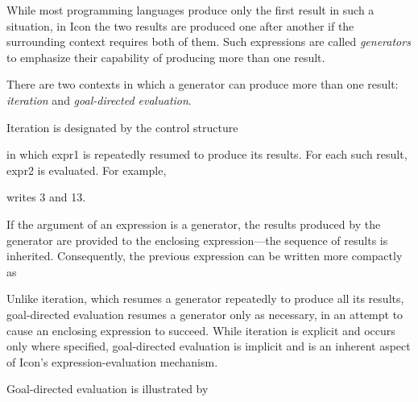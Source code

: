 While most programming languages produce only the first result in such
a situation, in Icon the two results are produced one after another if
the surrounding context requires both of them. Such expressions are
called \textit{generators} to emphasize their capability of producing
more than one result.

There are two contexts in which a generator can produce more than one
result: \textit{iteration} and \textit{goal-directed evaluation}.

Iteration is designated by the control structure



\noindent in which expr1 is repeatedly resumed to produce its
results. For each such result, expr2 is evaluated. For example,



\noindent writes 3 and 13.

If the argument of an expression is a generator, the results produced
by the generator are provided to the enclosing expression{}---the
sequence of results is inherited. Consequently, the previous
expression can be written more compactly as




Unlike iteration, which resumes a generator repeatedly to produce all
its results, goal-directed evaluation resumes a generator only as
necessary, in an attempt to cause an enclosing expression to
succeed. While iteration is explicit and occurs only where specified,
goal-directed evaluation is implicit and is an inherent aspect of
Icon's expression-evaluation mechanism.


Goal-directed evaluation is illustrated by



